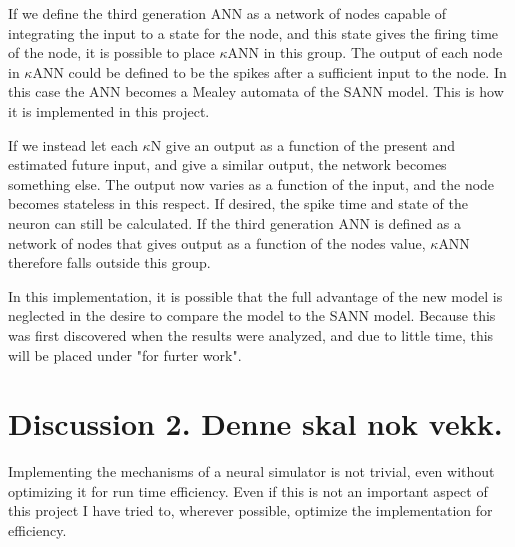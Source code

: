 If we define the third generation ANN as a network of nodes capable of integrating the input to a state for the node, and this state gives the firing time of the node, it is possible to place $\kappa$ANN in this group.
The output of each node in $\kappa$ANN could be defined to be the spikes after a sufficient input to the node.
In this case the ANN becomes a Mealey automata of the SANN model. This is how it is implemented in this project.

If we instead let each $\kappa$N give an output as a function of the present and estimated future input, and give a similar output, the network becomes something else.
The output now varies as a function of the input, and the node becomes stateless in this respect. If desired, the spike time and state of the neuron can still be calculated. 
If the third generation ANN is defined as a network of nodes that gives output as a function of the nodes value, $\kappa$ANN therefore falls outside this group.

In this implementation, it is possible that the full advantage of the new model is neglected in the desire to compare the model to the SANN model.
Because this was first discovered when the results were analyzed, and due to little time, this will be placed under "for furter work". %



\section{Discussion 2. Denne skal nok vekk.}


Implementing the mechanisms of a neural simulator is not trivial, even without optimizing it for run time efficiency.
Even if this is not an important aspect of this project I have tried to, wherever possible, optimize the implementation for efficiency.

